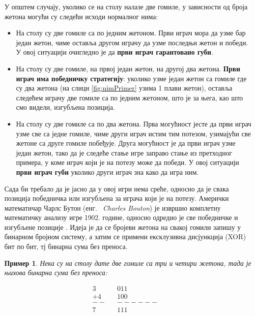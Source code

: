 \documentclass[a4paper]{article}
\newtheorem{example}{Пример}
\begin{document}
У општем случају, уколико се на столу налазе две гомиле, у зависности од броја жетона могући су следећи исходи нормалног нима:

\begin{itemize}
	\item На столу су две гомиле са по једним жетоном. Први играч мора да узме бар један жетон, чиме оставља другом играчу да узме последњи жетон и победи. У овој ситуацији очигледно је да \textbf{први играч гарантовано губи}.
	
	\item На столу су две гомиле, на првој један жетон, на другој два жетона. \textbf{Први играч има победничку стратегију}: уколико узме један жетон са гомиле где су два жетона (на слици \ref{fig:nimPrimer} узима 1 плави жетон), оставља следећем играчу две гомиле са по једним жетоном, што је за њега, као што смо видели, изгубљена позиција.
	
	\item На столу су две гомиле са по два жетона. Прва могућност јесте да први играч узме све са једне гомиле, чиме други играч истим тим потезом, узимајући све жетоне са друге гомиле побеђује. Друга могућност је да први играч узме један жетон, тако да је следеће стање игре заправо стање из претходног примера, у коме играч који је на потезу може да победи. У овој ситуацији \textbf{први играч губи} уколико други играч зна како да игра ним.
\end{itemize}

Сада би требало да је јасно да у овој игри нема среће, односно да је свака позиција победничка или изгубљена за играча који је на потезу. Амерички математичар Чарлс Бутон (енг. {~\em Charles Bouton}) је извршио комплетну математичку анализу игре 1902. године, односно одредио је све победничке и изгубљене позиције \cite{carls_buton}. Идеја је да се бројеви жетона на свакој гомили запишу у бинарном бројном систему, а затим се примени ексклузивна дисјункција (XOR) бит по бит, тј бинарна сума без преноса. 


\begin{example} 
	Нека су на столу дате две гомиле са три и четири жетона, тада је њихова бинарна сума без преноса:
	
	\begin{align*}
		3&		& 0 1 1&\\
		+4&		& 1 0 0&\\
		--&		&------&\\
		7&		& 1 1 1&
	\end{align*}
	
\end{example}
\end{document}
